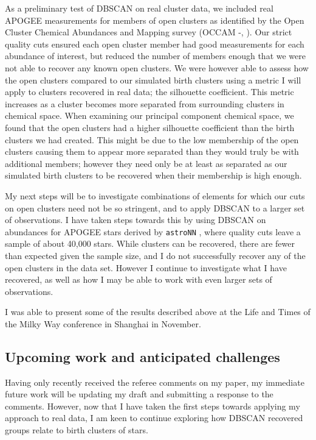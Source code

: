 \documentclass[11pt]{article}
\begin{document}
	As a preliminary test of DBSCAN on real cluster data, we included real APOGEE measurements for members of open clusters as identified by the Open Cluster Chemical Abundances and Mapping survey (OCCAM -\citealt{Frinchaboy2003}, \citealt{Donor2018}). Our strict quality cuts ensured each open cluster member had good measurements for each abundance of interest, but reduced the number of members enough that we were not able to recover any known open clusters. We were however able to assess how the open clusters compared to our simulated birth clusters using a metric I will apply to clusters recovered in real data; the silhouette coefficient. This metric increases as a cluster becomes more separated from surrounding clusters in chemical space. When examining our principal component chemical space, we found that the open clusters had a higher silhouette coefficient than the birth clusters we had created. This might be due to the low membership of the open clusters causing them to appear more separated than they would truly be with additional members; however they need only be at least as separated as our simulated birth clusters to be recovered when their membership is high enough.
	
	My next steps will be to investigate combinations of elements for which our cuts on open clusters need not be so stringent, and to apply DBSCAN to a larger set of observations. I have taken steps towards this by using DBSCAN on abundances for APOGEE stars derived by \texttt{astroNN} \citep{Leung2019}, where quality cuts leave a sample of about 40,000 stars. While clusters can be recovered, there are fewer than expected given the sample size, and I do not successfully recover any of the open clusters in the data set. However I continue to investigate what I have recovered, as well as how I may be able to work with even larger sets of observations.
	
	I was able to present some of the results described above at the Life and Times of the Milky Way conference in Shanghai in November.
    
    \subsection*{Upcoming work and anticipated challenges}
    
    Having only recently received the referee comments on my paper, my immediate future work will be updating my draft and submitting a response to the comments. However, now that I have taken the first steps towards applying my approach to real data, I am keen to continue exploring how DBSCAN recovered groups relate to birth clusters of stars. 
    
\end{document}

